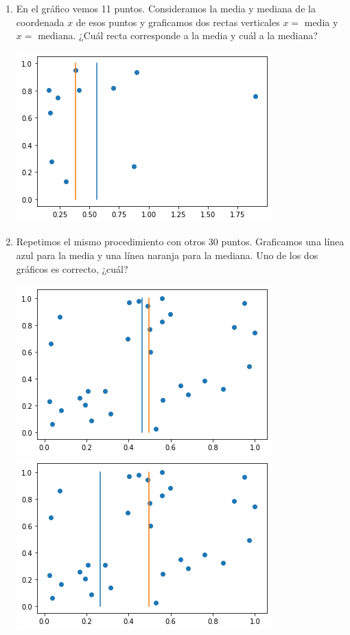 \documentclass[a4paper,11pt]{article}
\theoremstyle{definition}
\begin{document}
\begin{enumerate}[resume]
\item En el gráfico vemos 11 puntos. Consideramos la media y mediana de la coordenada $x$ de esos puntos y graficamos dos rectas verticales $x = $ media y $x = $ mediana. ¿Cuál recta corresponde a la media y cuál a la mediana?

\begin{center}
\includegraphics[scale=0.6]{practica2-img-media_mediana_1.png}
\end{center}

\item Repetimos el mismo procedimiento con otros 30 puntos. Graficamos una línea azul para la media y una línea naranja para la mediana. Uno de los dos gráficos es correcto, ¿cuál?

\begin{center}
\includegraphics[scale=0.5]{practica2-img-media_mediana_2.png}
\includegraphics[scale=0.5]{practica2-img-media_mediana_3.png}
\end{center}



\end{enumerate}
\end{document}
